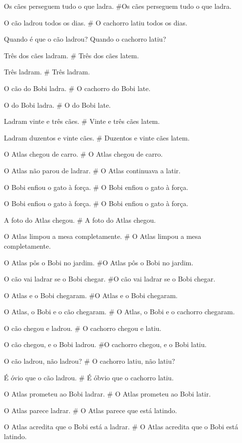 Os cães perseguem tudo o que ladra.
#Os cães perseguem tudo o que ladra.

O cão ladrou todos os dias.
# O cachorro latiu todos os dias.

Quando é  que o cão ladrou?
Quando o cachorro latiu?

Três dos cães ladram.
# Três dos cães latem.

Três ladram.
# Três ladram.

O cão do Bobi ladra.
# O  cachorro do Bobi late.

O do Bobi ladra.
# O do Bobi late.

Ladram vinte e três cães.
# Vinte e três cães latem.

Ladram duzentos e vinte cães.
# Duzentos e vinte cães latem.

O Atlas chegou de carro.
# O Atlas chegou de carro.

O Atlas não parou de ladrar.
# O Atlas continuava a latir.

O Bobi enfiou o gato à força.
# O Bobi enfiou o gato à força.

O Bobi enfiou o gato à força.
# O Bobi enfiou o gato à força.

A foto do Atlas chegou.
# A foto do Atlas chegou.

O Atlas limpou a mesa completamente.
# O Atlas limpou a mesa completamente.

O Atlas pôs o Bobi no jardim.
#O Atlas pôs o Bobi no jardim.

O cão vai ladrar se o Bobi chegar.
#O cão vai ladrar se o Bobi chegar.

O Atlas e o Bobi chegaram.
#O Atlas e o Bobi chegaram.

O Atlas, o Bobi e o cão chegaram.
# O Atlas, o Bobi e o cachorro chegaram.

O cão chegou e ladrou.
# O cachorro chegou e latiu.

O cão chegou, e o Bobi ladrou.
#O cachorro chegou, e o Bobi latiu.

O cão ladrou, não ladrou?
# O cachorro latiu, não latiu?

É óvio que o cão ladrou.
# É óbvio que o cachorro latiu.

O Atlas prometeu ao Bobi ladrar.
# O Atlas prometeu ao Bobi latir.

O Atlas parece ladrar.
# O Atlas parece que está latindo.

O Atlas acredita que o Bobi está a ladrar.
# O Atlas acredita que o Bobi está latindo.

